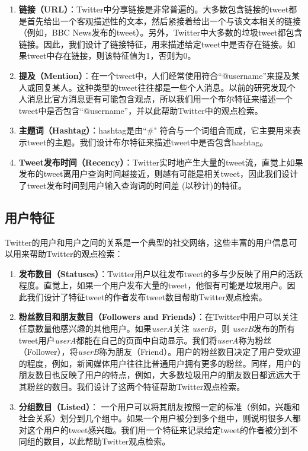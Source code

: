   \begin{enumerate}
\item{\textbf{链接（URL）}}：Twitter中分享链接是非常普遍的。大多数包含链接的tweet都是首先给出一个客观描述性的文本，然后紧接着给出一个与该文本相关的链接（例如，BBC News发布的tweet）。另外，Twitter中大多数的垃圾tweet都包含链接。因此，我们设计了链接特征，用来描述给定tweet中是否存在链接。如果tweet中存在链接，则该特征值为1，否则为0。
\item{\textbf{提及（Mention）}}：在一个tweet中，人们经常使用符合“@username”来提及某人或回复某人。这种类型的tweet往往都是一些个人消息。以前的研究发现个人消息比官方消息更有可能包含观点，所以我们用一个布尔特征来描述一个tweet中是否包含“@username”，并以此帮助Twitter中的观点检索。
\item\textbf{\textbf{主题词（Hashtag）}}：hashtag是由``\#" 符合与一个词组合而成，它主要用来表示tweet的主题。我们设计布尔特征来描述tweet中是否包含hashtag。
\item\textbf{\textbf{Tweet发布时间（Recency）}}：Twitter实时地产生大量的tweet流，直觉上如果发布的tweet离用户查询时间越接近，则越有可能是相关tweet，因此我们设计了tweet发布时间到用户输入查询词的时间差 (以秒计)的特征。
\end{enumerate}

\subsection{用户特征}
Twitter的用户和用户之间的关系是一个典型的社交网络，这些丰富的用户信息可以用来帮助Twitter的观点检索：

  \begin{enumerate}
  \item{\textbf{发布数目（Statuses）}}：Twitter用户以往发布tweet的多与少反映了用户的活跃程度。直觉上，如果一个用户发布大量的tweet，他很有可能是垃圾用户。因此我们设计了特征tweet的作者发布tweet数目帮助Twitter观点检索。
   \item{\textbf{粉丝数目和朋友数目（Followers and Friends）}}：在Twitter中用户可以关注任意数量他感兴趣的其他用户。如果{\em userA}关注 {\em userB}，则 {\em userB}发布的所有tweet用户{\em userA}都能在自己的页面中自动显示。我们将{\em userA}称为粉丝（Follower），将{\em userB}称为朋友（Friend）。用户的粉丝数目决定了用户受欢迎的程度，例如，新闻媒体用户往往比普通用户拥有更多的粉丝。同样，用户的朋友数目也反映了用户的特点，例如，大多数垃圾用户的朋友数目都远远大于其粉丝的数目。我们设计了这两个特征帮助Twitter观点检索。
   \item{\textbf{分组数目（Listed）}}： 一个用户可以将其朋友按照一定的标准（例如，兴趣和社会关系）划分到几个组中。如果一个用户被分到多个组中，则说明很多人都对这个用户的tweet感兴趣。我们用一个特征来记录给定tweet的作者被分到不同组的数目，以此帮助Twitter观点检索。
  \end{enumerate}

